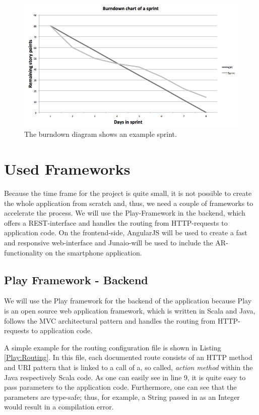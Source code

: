 \begin{figure}[th]
\centerline{\includegraphics[width=1\textwidth]{gfx/burndown}}
\caption{The burndown diagram shows an example sprint.}
\label{Burndown example}
\end{figure}

\section{Used Frameworks}
Because the time frame for the project is quite small, it is not possible to create the whole application from scratch and, thus, we need a couple of frameworks to accelerate the process. We will use the Play-Framework in the backend, which offers a \ac{REST}-interface and handles the routing from \ac{HTTP}-requests to application code. On the frontend-side, AngularJS will be used to create a fast and responsive web-interface and Junaio-will be used to include the \ac{AR}-functionality on the smartphone application.

\subsection{Play Framework - Backend}	
We will use the Play framework for the backend of the application because Play is an open source web application framework, which is written in Scala and Java, follows the \ac{MVC} architectural pattern and handles the routing from \ac{HTTP}-requests to application code. 

A simple example for the routing configuration file is shown in Listing \ref{Play:Routing}. In this file, each documented route consists of an \ac{HTTP} method and \ac{URI} pattern that is linked to a call of a, so called, \textit{action method} within the Java respectively Scala code. As one can easily see in line 9, it is quite easy to pass parameters to the application code. Furthermore, one can see that the parameters are type-safe; thus, for example, a String passed in as an Integer would result in a compilation error. 

